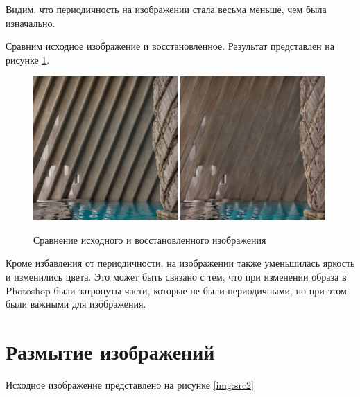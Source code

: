 Видим, что периодичность на изображении стала весьма меньше, чем была изначально.

Сравним исходное изображение и восстановленное. Результат представлен на рисунке \ref{img:compare}.

\begin{figure}[ht!]
    \centering
    \includegraphics[width=0.49\textwidth]{8.png}
    \includegraphics[width=0.49\textwidth]{restored.png}
    \caption{Сравнение исходного и восстановленного изображения}
    \label{img:compare}
\end{figure}

Кроме избавления от периодичности, на изображении также уменьшилась яркость и изменились цвета. 
Это может быть связано с тем, что при изменении образа в Photoshop были затронуты части, которые не были периодичными, но при этом были важными для изображения.


\FloatBarrier
\section{Размытие изображений}

Исходное изображение представлено на рисунке \ref{img:src2}

